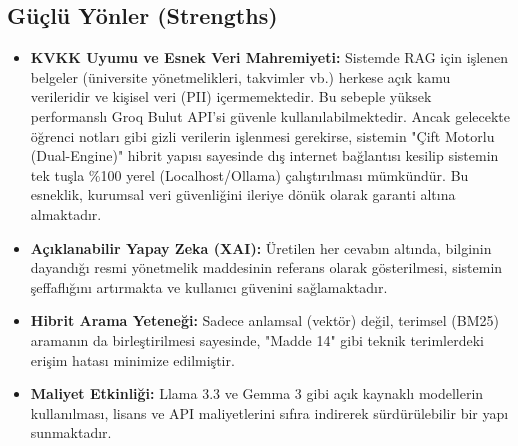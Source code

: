 \documentclass[12pt,a4paper]{report}
\begin{document}
\subsection{Güçlü Yönler (Strengths)}
\begin{itemize}
    \item \textbf{KVKK Uyumu ve Esnek Veri Mahremiyeti:} Sistemde RAG için işlenen belgeler (üniversite yönetmelikleri, takvimler vb.) herkese açık kamu verileridir ve kişisel veri (PII) içermemektedir. Bu sebeple yüksek performanslı Groq Bulut API'si güvenle kullanılabilmektedir. Ancak gelecekte öğrenci notları gibi gizli verilerin işlenmesi gerekirse, sistemin "Çift Motorlu (Dual-Engine)" hibrit yapısı sayesinde dış internet bağlantısı kesilip sistemin tek tuşla \%100 yerel (Localhost/Ollama) çalıştırılması mümkündür. Bu esneklik, kurumsal veri güvenliğini ileriye dönük olarak garanti altına almaktadır.
    \item \textbf{Açıklanabilir Yapay Zeka (XAI):} Üretilen her cevabın altında, bilginin dayandığı resmi yönetmelik maddesinin referans olarak gösterilmesi, sistemin şeffaflığını artırmakta ve kullanıcı güvenini sağlamaktadır.
    \item \textbf{Hibrit Arama Yeteneği:} Sadece anlamsal (vektör) değil, terimsel (BM25) aramanın da birleştirilmesi sayesinde, "Madde 14" gibi teknik terimlerdeki erişim hatası minimize edilmiştir.
    \item \textbf{Maliyet Etkinliği:} Llama 3.3 ve Gemma 3 gibi açık kaynaklı modellerin kullanılması, lisans ve API maliyetlerini sıfıra indirerek sürdürülebilir bir yapı sunmaktadır.
\end{itemize}
\end{document}
